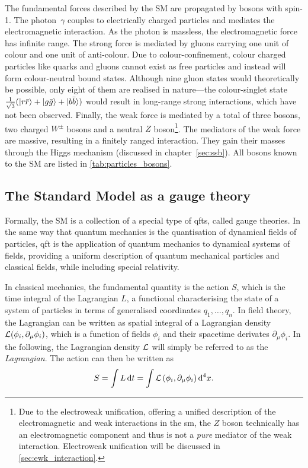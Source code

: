 The fundamental forces described by the SM are propagated by bosons with spin-1.
The photon~$\gamma$ couples to electrically charged particles and mediates the electromagnetic interaction.
As the photon is massless, the electromagnetic force has infinite range.
The strong force is mediated by gluons carrying one unit of colour and one unit of anti-colour.
Due to colour-confinement, colour charged particles like quarks and gluons cannot exist as free particles and instead will form colour-neutral bound states.
Although nine gluon states would theoretically be possible, only eight of them are realised in nature---the colour-singlet state $\frac{1}{\sqrt{3}}(\ket{r\bar{r}}+\ket{g\bar{g}}+\ket{b\bar{b}})$ would result in long-range strong interactions, which have not been observed.
Finally, the weak force is mediated by a total of three bosons, two charged $W^\pm$ bosons and a neutral $Z$ boson\footnote{Due to the electroweak unification, offering a unified description of the electromagnetic and weak interactions in the \gls{sm}, the $Z$ boson technically has an electromagnetic component and thus is not a \textit{pure} mediator of the weak interaction. Electroweak unification will be discussed in \cref{sec:ewk_interaction}.}.
The mediators of the weak force are massive, resulting in a finitely ranged interaction. They gain their masses through the Higgs mechanism (discussed in chapter~\cref{sec:ssb}). All bosons known to the SM are listed in \cref{tab:particles_bosons}.

\subsection{The Standard Model as a gauge theory}\label{ch:gauge_theory}

Formally, the SM is a collection of a special type of \glspl{qft}, called gauge theories. In the same way that quantum mechanics is the quantisation of dynamical fields of particles, \gls{qft} is the application of quantum mechanics to dynamical systems of fields, providing a uniform description of quantum mechanical particles and classical fields, while including special relativity.

In classical mechanics, the fundamental quantity  is the action $S$, which is the time integral of the Lagrangian $L$, a functional characterising the state of a system of particles in terms of generalised coordinates $q_1, \dots, q_n$. In field theory, the Lagrangian can be written as spatial integral of a Lagrangian density $\mathcal{L}(\phi_i,\partial_\mu\phi_i)$, which is a function of fields $\phi_i$ and their spacetime derivates $\partial_\mu\phi_i$. In the following, the Lagrangian density $\mathcal{L}$ will simply be referred to as the \textit{Lagrangian}. The action can then be written as
\begin{equation}
	S = \int L\mathop{}\!\mathrm{d} t = \int\mathcal{L}\left(\phi_i,\partial_\mu\phi_i\right)\mathop{}\!\mathrm{d^4} x.
\end{equation}

